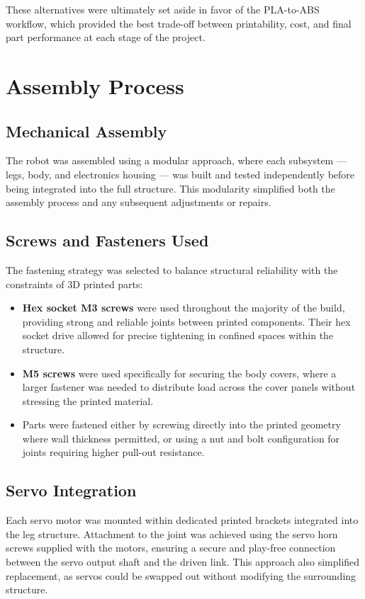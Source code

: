 \documentclass{article}
\begin{document}
These alternatives were ultimately set aside in favor of the PLA-to-ABS workflow, which provided the best trade-off between printability, cost, and final part performance at each stage of the project.

\section{Assembly Process}

\subsection*{Mechanical Assembly}

The robot was assembled using a modular approach, where each subsystem --- legs, body, and electronics housing --- was built and tested independently before being integrated into the full structure. This modularity simplified both the assembly process and any subsequent adjustments or repairs.

\subsection*{Screws and Fasteners Used}

The fastening strategy was selected to balance structural reliability with the constraints of 3D printed parts:

\begin{itemize}
    \item \textbf{Hex socket M3 screws} were used throughout the majority of the build, providing strong and reliable joints between printed components. Their hex socket drive allowed for precise tightening in confined spaces within the structure.
    \item \textbf{M5 screws} were used specifically for securing the body covers, where a larger fastener was needed to distribute load across the cover panels without stressing the printed material.
    \item Parts were fastened either by screwing directly into the printed geometry where wall thickness permitted, or using a nut and bolt configuration for joints requiring higher pull-out resistance.
\end{itemize}

\subsection*{Servo Integration}

Each servo motor was mounted within dedicated printed brackets integrated into the leg structure. Attachment to the joint was achieved using the servo horn screws supplied with the motors, ensuring a secure and play-free connection between the servo output shaft and the driven link. This approach also simplified replacement, as servos could be swapped out without modifying the surrounding structure.
\end{document}
